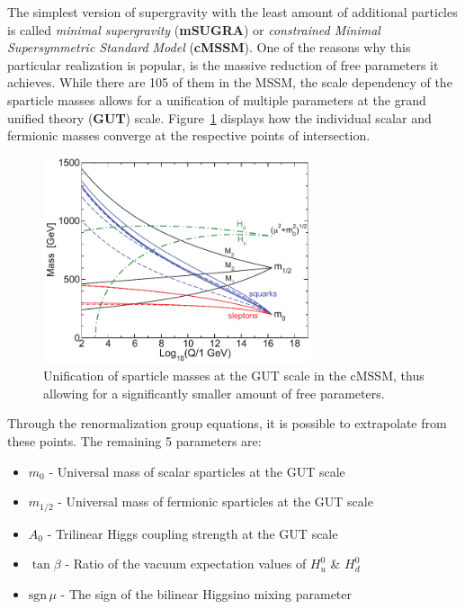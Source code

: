 The simplest version of supergravity with the least amount of additional particles is called \textit{minimal supergravity} (\textbf{mSUGRA}) or \textit{constrained Minimal Supersymmetric Standard Model} (\textbf{cMSSM}). One of the reasons why this particular realization is popular, is the massive reduction of free parameters it achieves. While there are 105 of them in the MSSM, the scale dependency of the sparticle masses allows for a unification of multiple parameters at the grand unified theory (\textbf{GUT}) scale. Figure~\ref{fig:msugrarge} displays how the individual scalar and fermionic masses converge at the respective points of intersection.

\begin{figure}[ht!]
  \centering
  \includegraphics[width=0.7\textwidth]{plots/msugrarge.pdf}
  \caption{Unification of sparticle masses at the GUT scale in the cMSSM, thus allowing for a significantly smaller amount of free parameters.}
  \label{fig:msugrarge}
\end{figure}

\noindent Through the renormalization group equations, it is possible to extrapolate from these points. The remaining 5 parameters are:

\begin{itemize}
\item $m_0$ - Universal mass of scalar sparticles at the GUT scale
\item $m_{1/2}$ - Universal mass of fermionic sparticles at the GUT scale
\item $A_0$ - Trilinear Higgs coupling strength at the GUT scale
\item $\tan{\beta}$ - Ratio of the vacuum expectation values of $H^0_u$ \& $H^0_d$
\item $\text{sgn}\,\mu$ - The sign of the bilinear Higgsino mixing parameter
\end{itemize}

